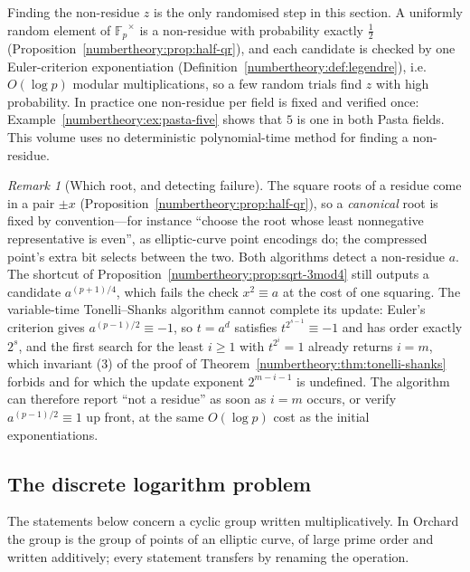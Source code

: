 \documentclass[11pt,a4paper]{article}
\theoremstyle{definition}
\theoremstyle{remark}
\newtheorem{remark}[theorem]{Remark}
\newcommand{\Fp}{\ensuremath{\mathbb{F}_{p}}}
\begin{document}
Finding the non-residue \(z\) is the only randomised step in this
section. A uniformly random element of \(\Fp^\times\) is a non-residue
with probability exactly \(\tfrac12\)
(Proposition~\ref{numbertheory:prop:half-qr}), and each candidate is
checked by one Euler-criterion exponentiation
(Definition~\ref{numbertheory:def:legendre}), i.e.\ \(O(\log p)\)
modular multiplications, so a few random trials find \(z\) with high
probability. In practice one non-residue per field is fixed and verified
once: Example~\ref{numbertheory:ex:pasta-five} shows that \(5\) is one in
both Pasta fields. This volume uses no deterministic polynomial-time method
for finding a non-residue.

\begin{remark}[Which root, and detecting failure]
\label{numbertheory:rem:sqrt-uniqueness}
The square roots of a residue come in a pair \(\pm x\)
(Proposition~\ref{numbertheory:prop:half-qr}), so a \emph{canonical}
root is fixed by convention---for instance ``choose the
root whose least nonnegative representative is even'', as
elliptic-curve point encodings do; the compressed point's extra bit
selects between the two. Both algorithms detect a non-residue \(a\).
The shortcut of Proposition~\ref{numbertheory:prop:sqrt-3mod4} still
outputs a candidate \(a^{(p+1)/4}\), which fails the check
\(x^2 \equiv a\) at the cost of one squaring. The variable-time
Tonelli--Shanks algorithm cannot complete its update: Euler's
criterion gives \(a^{(p-1)/2} \equiv -1\), so \(t = a^d\) satisfies
\(t^{2^{s-1}} \equiv -1\) and has order exactly \(2^s\), and the first
search for the least \(i \ge 1\) with \(t^{2^i} = 1\) already
returns \(i = m\), which invariant (3) of the proof of
Theorem~\ref{numbertheory:thm:tonelli-shanks} forbids and for which
the update exponent \(2^{m-i-1}\) is undefined. The algorithm can
therefore report ``not a residue'' as soon as \(i = m\) occurs, or
verify \(a^{(p-1)/2} \equiv 1\) up front, at the same \(O(\log p)\) cost
as the initial exponentiations.
\end{remark}

\subsection{The discrete logarithm problem}\label{numbertheory:sub:dlog}

The statements below concern a cyclic group written multiplicatively.
In Orchard the group is the group of points of an elliptic curve, of
large prime order and written additively; every statement transfers by
renaming the operation.
\end{document}
